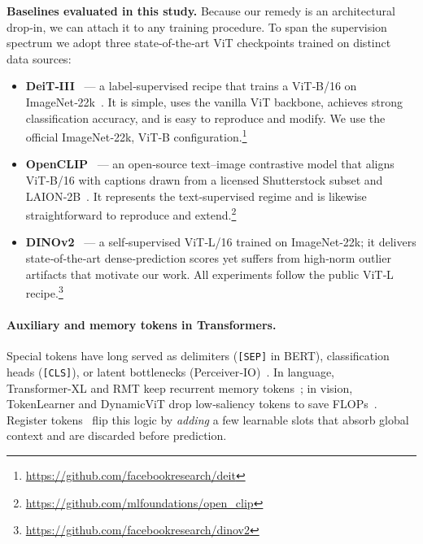 \documentclass{article}
\newcommand{\citep}{\parencite}
\begin{document}
\vspace{0.3em}\noindent
\textbf{Baselines evaluated in this study.}
Because our remedy is an architectural drop‑in, we can attach it to any training procedure.  
To span the supervision spectrum we adopt three state‑of‑the‑art ViT checkpoints trained on distinct data sources:

\begin{itemize}
  \item \textbf{DeiT‑III} \citep{touvronDeiTIIIRevenge2022} — a label‑supervised recipe that trains a ViT‑B/16 on ImageNet‑22k \citep{dengImageNetLargescaleHierarchical2009}.
        It is simple, uses the vanilla ViT backbone, achieves strong classification accuracy, and is easy to reproduce and modify.  
        We use the official ImageNet‑22k, ViT‑B configuration.\footnote{\url{https://github.com/facebookresearch/deit}}
  \item \textbf{OpenCLIP} \citep{ilharco_gabriel_2021_5143773} — an open‑source text–image contrastive model that aligns ViT‑B/16 with captions drawn from a licensed Shutterstock subset and LAION‑2B \citep{schuhmannLAION5BOpenLargescale2022}.
        It represents the text‑supervised regime and is likewise straightforward to reproduce and extend.\footnote{\url{https://github.com/mlfoundations/open_clip}}
  \item \textbf{DINOv2} \citep{oquabDINOv2LearningRobust2024} — a self‑supervised ViT‑L/16 trained on ImageNet‑22k; it delivers state‑of‑the‑art dense‑prediction scores yet suffers from high‑norm outlier artifacts that motivate our work.
        All experiments follow the public ViT‑L recipe.\footnote{\url{https://github.com/facebookresearch/dinov2}}
\end{itemize}

\paragraph{Auxiliary and memory tokens in Transformers.}
Special tokens have long served as delimiters (\texttt{[SEP]} in BERT), classification heads (\texttt{[CLS]}), or latent bottlenecks (Perceiver‑IO) \citep{devlinBERTPretrainingDeep2019,jaeglePerceiverIOGeneral2021}.  
In language, Transformer‑XL and RMT keep recurrent memory tokens \citep{bulatovRecurrentMemoryTransformer2022}; in vision, TokenLearner and DynamicViT drop low‑saliency tokens to save FLOPs \citep{ryooTokenLearnerAdaptiveSpacetime2021,raoDynamicViTEfficientVision2021}.  
Register tokens \citep{darcetVisionTransformersNeed2024} flip this logic by \emph{adding} a few learnable slots that absorb global context and are discarded before prediction.
\end{document}
